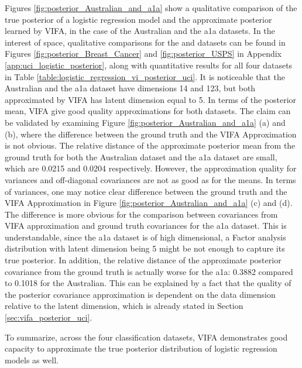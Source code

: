 \documentclass[10pt]{article} %
\begin{document}
Figures \ref{fig:posterior_Australian_and_a1a} show a qualitative comparison of the true posterior of a logistic regression model and the approximate posterior learned by VIFA, in the case of the Australian and the a1a datasets. In the interest of space, qualitative comparisons for the  and datasets can be found in Figures \ref{fig:posterior_Breast_Cancer} and \ref{fig:posterior_USPS} in Appendix \ref{app:uci_logistic_posterior}, along with quantitative results for all four datasets in Table \ref{table:logistic_regression_vi_posterior_uci}. It is noticeable that the Australian and the a1a dataset have dimensions 14 and 123, but both approximated by VIFA has latent dimension equal to 5. In terms of the posterior mean, VIFA give good quality approximations for both datasets. The claim can be validated by examining Figure \ref{fig:posterior_Australian_and_a1a} (a) and (b), where the difference between the ground truth and the VIFA Approximation is not obvious. The relative distance of the approximate posterior mean from the ground truth for both the Australian dataset and the a1a dataset are small, which are 0.0215 and 0.0204 respectively. However, the approximation quality for variances and off-diagonal covariances are not as good as for the means. In terms of variances, one may notice clear difference between the ground truth and the VIFA Approximation in Figure \ref{fig:posterior_Australian_and_a1a} (c) and (d). The difference is more obvious for the comparison between covariances from VIFA approximation and ground truth covariances for the a1a dataset. This is understandable, since the a1a dataset is of high dimensional, a Factor analysis distribution with latent dimension being 5 might be not enough to capture its true posterior. In addition, the relative distance of the approximate posterior covariance from the ground truth is actually worse for the a1a: 0.3882 compared to 0.1018 for the Australian. 
This can be explained by a fact that the quality of the posterior covariance approximation is dependent on the data dimension relative to the latent dimension, which is already stated in Section \ref{sec:vifa_posterior_uci}.

To summarize, across the four classification datasets, VIFA demonstrates good capacity to approximate the true posterior distribution of logistic regression models as well.
\end{document}
